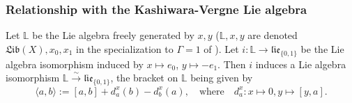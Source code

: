 \documentclass[10pt]{amsart}
\newcommand{\Add}[1]{\textcolor{black}{#1}} %
\numberwithin{equation}{subsection}
\begin{document}
\subsubsection{Relationship with the Kashiwara-Vergne Lie algebra}\label{sect:announcement:krv}


Let $\mathbb L$ be the Lie algebra freely generated by $x,y$
($\mathbb L,x,y$ are denoted $\mathfrak{Lib}(X),x_0,x_1$ in the specialization to $\Gamma=1$ of \cite{R}). 
Let $i : \mathbb L\to\mathfrak{lie}_{\{0,1\}}$  be the Lie algebra isomorphism induced by $x\mapsto e_0$, $y\mapsto -e_1$. 
Then $i$ induces a Lie algebra isomorphism $\mathbb L\stackrel{\sim}{\to}\mathfrak{lie}_{\{0,1\}}$, the bracket on 
$\mathbb L$ being given by 
$$
\langle a,b\rangle:=[a,b]+d_a^x(b)-d_b^x(a), \quad \textrm{where} \quad d^x_a : x\mapsto 0,y\mapsto[y,a]. 
$$

  

\end{document}
